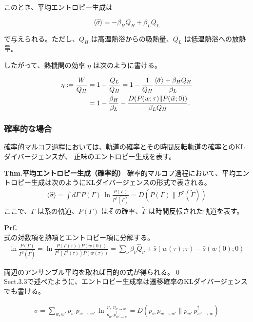 \documentclass[a4paper,11pt]{jsarticle}
\numberwithin{equation}{section}
\begin{document}
このとき、平均エントロピー生成は

\[
\langle \hat{\sigma} \rangle = -\beta_H Q_H + \beta_L Q_L
\]

で与えられる。ただし、$Q_H$ は高温熱浴からの吸熱量、$Q_L$ は低温熱浴への放熱量。

したがって、熱機関の効率 $\eta$ は次のように書ける。

\begin{align}
    \eta := \frac{W}{Q_H}
    &= 1 - \frac{Q_L}{Q_H}
    = 1 - \frac{1}{Q_H} \frac{\langle \hat{\sigma} \rangle + \beta_H Q_H}{\beta_L} \notag \\
    &= 1 - \frac{\beta_H}{\beta_L}
    - \frac{D(P(w; \tau) \| P(\bar{w}; 0))}{\beta_L Q_H}.
\end{align}

\subsubsection{確率的な場合}

確率的マルコフ過程においては、軌道の確率とその時間反転軌道の確率とのKLダイバージェンスが、
正味のエントロピー生成を表す。

\begin{itembox}[l]{\textbf{Thm.平均エントロピー生成（確率的）}}
    確率的マルコフ過程において、平均エントロピー生成は次のようにKLダイバージェンスの形式で表される。
\begin{align}
\langle \hat{\sigma} \rangle
= \int d\Gamma\, P(\Gamma)\, \ln \frac{P(\Gamma)}{P^{\dagger}(\tilde{\Gamma})}
= D(P(\Gamma) \| P^{\dagger}(\tilde{\Gamma}))
\end{align}
ここで、$\Gamma$ は系の軌道、$P(\Gamma)$ はその確率、$\tilde{\Gamma}$ は時間反転された軌道を表す。
\end{itembox}
\textbf{Prf.} \\
式の対数項を熱項とエントロピー項に分解する。
\begin{align}
\ln \frac{P(\Gamma)}{P^{\dagger}(\tilde{\Gamma})}
= \ln \frac{P(\Gamma(\tau)) P(w(0))}{P^{\dagger}(\Gamma^{\dagger}(\tau)) P(w(\tau))}
= \sum_\nu \beta_\nu \hat{Q}_\nu + \hat{s}(w(\tau); \tau) - \hat{s}(w(0); 0)
\end{align}

両辺のアンサンブル平均を取れば目的の式が得られる。\qed\\

Sect.3.3で述べたように、エントロピー生成率は遷移確率のKLダイバージェンスでも書ける。

\begin{align}
\dot{\sigma} 
= \sum_{w, w'} p_w\, p_{w \to w'}\, \ln \frac{p_w\, p_{w \to w'}}{p_{w'}\, p^{\dagger}_{w' \to w}}
= D(p_w\, p_{w \to w'} \| p_{w'}\, p^{\dagger}_{w' \to w})
\end{align}
\end{document}
